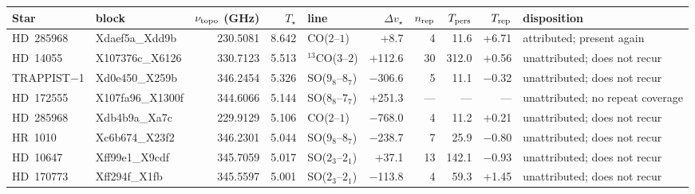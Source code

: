 \begin{tabular}{@{}l@{~}l@{~}r@{~}r@{~}l@{~}r@{~~}r@{~}r@{~}r@{~}l@{}}
\hline
Star & block & $\nu_{\rm topo}$ (GHz) & $T_\star$ & line & $\Delta v_\star$ & $n_{\rm rep}$ & $T_{\rm pers}$ & $T_{\rm rep}$ & disposition \\
\hline
HD~285968 & Xdaef5a\_Xdd9b & 230.5081 & 8.642 & CO($2$--$1$) & +8.7 & 4 & 11.6 & +6.71 & attributed; present again \\
HD~14055 & X107376c\_X6126 & 330.7123 & 5.513 & $^{13}$CO($3$--$2$) & +112.6 & 30 & 312.0 & +0.56 & unattributed; does not recur \\
TRAPPIST$-$1 & Xd0e450\_X259b & 346.2454 & 5.326 & SO($9_{8}$--$8_{7}$) & \ensuremath{-}306.6 & 5 & 11.1 & \ensuremath{-}0.32 & unattributed; does not recur \\
HD~172555 & X107fa96\_X1300f & 344.6066 & 5.144 & SO($8_{8}$--$7_{7}$) & +251.3 & --- & --- & --- & unattributed; no repeat coverage \\
HD~285968 & Xdb4b9a\_Xa7c & 229.9129 & 5.106 & CO($2$--$1$) & \ensuremath{-}768.0 & 4 & 11.2 & +0.21 & unattributed; does not recur \\
HR~1010 & Xc6b674\_X23f2 & 346.2301 & 5.044 & SO($9_{8}$--$8_{7}$) & \ensuremath{-}238.7 & 7 & 25.9 & \ensuremath{-}0.80 & unattributed; does not recur \\
HD~10647 & Xff99e1\_X9cdf & 345.7059 & 5.017 & SO($2_{3}$--$2_{1}$) & +37.1 & 13 & 142.1 & \ensuremath{-}0.93 & unattributed; does not recur \\
HD~170773 & Xff294f\_X1fb & 345.5597 & 5.001 & SO($2_{3}$--$2_{1}$) & \ensuremath{-}113.8 & 4 & 59.3 & +1.45 & unattributed; does not recur \\
\hline
\end{tabular}
